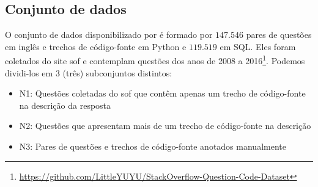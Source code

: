 \subsection{Conjunto de dados}
\label{sec:conjunto-dados}

O conjunto de dados disponibilizado por  é formado por $\bm{147.546}$ pares de questões em inglês e trechos de código-fonte em Python e $\bm{119.519}$ em SQL. Eles foram coletados do site \Gls{sof} e contemplam questões dos anos de 2008 a 2016\footnote{\url{https://github.com/LittleYUYU/StackOverflow-Question-Code-Dataset}}. Podemos dividi-los em 3 (três) subconjuntos distintos:

\begin{itemize}
    \item N1: Questões coletadas do \Gls{sof} que contêm apenas um trecho de código-fonte na descrição da resposta
    \item N2: Questões que apresentam mais de um trecho de código-fonte na descrição
    \item N3: Pares de questões e trechos de código-fonte anotados manualmente
\end{itemize}



